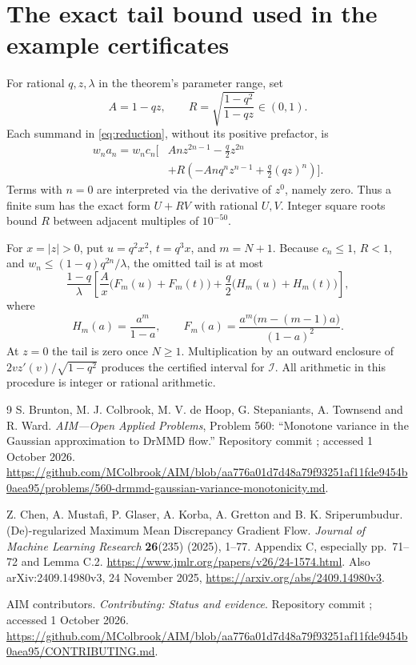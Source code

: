 \documentclass[11pt]{article}
\theoremstyle{remark}
\newcommand{\Ical}{\mathcal I}
\begin{document}
\appendix
\section{The exact tail bound used in the example certificates}
For rational $q,z,\lambda$ in the theorem's parameter range, set
\[
 A=1-qz,\qquad R=\sqrt{\frac{1-q^2}{1-qz}}\in(0,1).
\]
Each summand in \eqref{eq:reduction}, without its positive prefactor, is
\begin{equation*}\begin{aligned}
 w_na_n=w_nc_n\bigg[&A n z^{2n-1}-\frac q2z^{2n}\\
 &+R\left(-A n q^nz^{n-1}+\frac q2(qz)^n\right)\bigg].
\end{aligned}\end{equation*}
Terms with $n=0$ are interpreted via the derivative of $z^0$, namely zero.
Thus a finite sum has the exact form $U+RV$ with rational $U,V$.
Integer square roots bound $R$ between adjacent multiples of $10^{-50}$.

For $x=|z|>0$, put $u=q^2x^2$, $t=q^3x$, and $m=N+1$.
Because $c_n\le1$, $R<1$, and $w_n\le(1-q)q^{2n}/\lambda$, the omitted tail is at most
\begin{equation}\label{eq:tail}
 \frac{1-q}{\lambda}\left[
 \frac A{x}\bigl(F_m(u)+F_m(t)\bigr)
 +\frac q2\bigl(H_m(u)+H_m(t)\bigr)\right],
\end{equation}
where
\[
 H_m(a)=\frac{a^m}{1-a},\qquad
 F_m(a)=\frac{a^m\bigl(m-(m-1)a\bigr)}{(1-a)^2}.
\]
At $z=0$ the tail is zero once $N\ge1$.
Multiplication by an outward enclosure of
$2v z'(v)/\sqrt{1-q^2}$ produces the certified interval for $\Ical$.
All arithmetic in this procedure is integer or rational arithmetic.

\begin{thebibliography}{9}
S. Brunton, M. J. Colbrook, M. V. de Hoop, G. Stepaniants, A. Townsend and R. Ward.
\emph{AIM---Open Applied Problems}, Problem 560: ``Monotone variance in the Gaussian approximation to DrMMD flow.'' Repository commit ; accessed 1 October 2026.
\url{https://github.com/MColbrook/AIM/blob/aa776a01d7d48a79f93251af11fde9454b0aea95/problems/560-drmmd-gaussian-variance-monotonicity.md}.

Z. Chen, A. Mustafi, P. Glaser, A. Korba, A. Gretton and B. K. Sriperumbudur.
(De)-regularized Maximum Mean Discrepancy Gradient Flow.
\emph{Journal of Machine Learning Research} \textbf{26}(235) (2025), 1--77.
Appendix C, especially pp.\ 71--72 and Lemma C.2.
\url{https://www.jmlr.org/papers/v26/24-1574.html}.
Also arXiv:2409.14980v3, 24 November 2025,
\url{https://arxiv.org/abs/2409.14980v3}.

AIM contributors. \emph{Contributing: Status and evidence}.
Repository commit ; accessed 1 October 2026.
\url{https://github.com/MColbrook/AIM/blob/aa776a01d7d48a79f93251af11fde9454b0aea95/CONTRIBUTING.md}.
\end{thebibliography}
\end{document}
